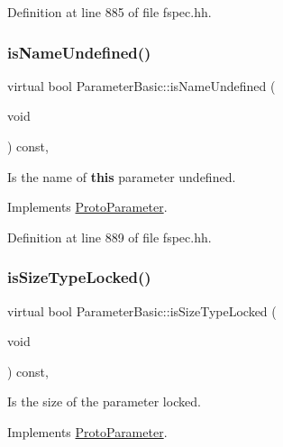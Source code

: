Definition at line 885 of file fspec.\+hh.

\mbox{\label{class_parameter_basic_a0385f1293c9dffdb691c479e7b82a239}} 
\subsubsection{\texorpdfstring{isNameUndefined()}{isNameUndefined()}}
{\footnotesize\ttfamily virtual bool Parameter\+Basic\+::is\+Name\+Undefined (\begin{DoxyParamCaption}\item[{void}]{ }\end{DoxyParamCaption}) const\hspace{0.3cm}{\ttfamily [inline]}, {\ttfamily [virtual]}}



Is the name of {\bfseries{this}} parameter undefined. 



Implements \mbox{\hyperlink{class_proto_parameter_a62d78489a16faff7cff6db6a1cf2593f}{Proto\+Parameter}}.



Definition at line 889 of file fspec.\+hh.

\mbox{\label{class_parameter_basic_ab8644a632a02193f26e4499bbfa7dbc9}} 
\subsubsection{\texorpdfstring{isSizeTypeLocked()}{isSizeTypeLocked()}}
{\footnotesize\ttfamily virtual bool Parameter\+Basic\+::is\+Size\+Type\+Locked (\begin{DoxyParamCaption}\item[{void}]{ }\end{DoxyParamCaption}) const\hspace{0.3cm}{\ttfamily [inline]}, {\ttfamily [virtual]}}



Is the size of the parameter locked. 



Implements \mbox{\hyperlink{class_proto_parameter_ad1a249d140c17d040845d0bcf8307fd0}{Proto\+Parameter}}.




